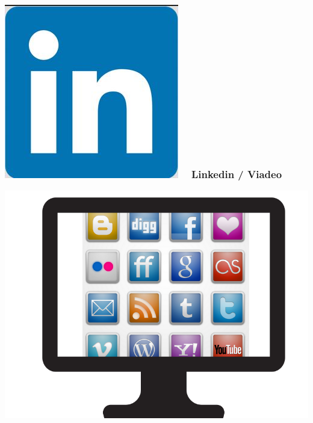 \documentclass{beamer}
\begin{document}
\begin{frame}
\frametitle{\includegraphics[scale=0.15] {./images/linkedin_logo.jpg} ~ Linkedin / Viadeo}
\begin{center}
\includegraphics[scale=0.4] {./images/Resaux_sociaux.png} 
\end{center}
\end{frame}
\end{document}
